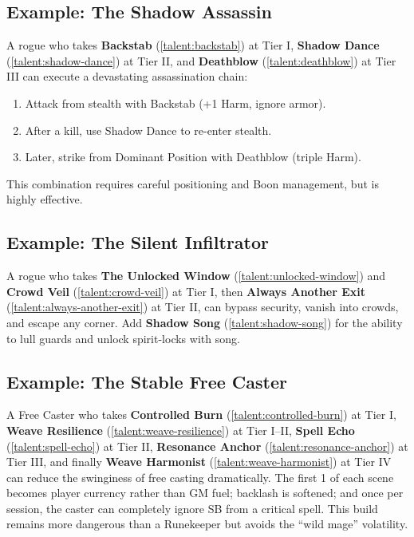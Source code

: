 \subsection*{Example: The Shadow Assassin}
\label{sec:shadow-assassin-example}
A rogue who takes \textbf{Backstab} (\ref{talent:backstab}) at Tier I, \textbf{Shadow Dance} (\ref{talent:shadow-dance}) at Tier II, and \textbf{Deathblow} (\ref{talent:deathblow}) at Tier III can execute a devastating assassination chain:
\begin{enumerate}
\item Attack from stealth with Backstab (+1 Harm, ignore armor).
\item After a kill, use Shadow Dance to re-enter stealth.
\item Later, strike from Dominant Position with Deathblow (triple Harm).
\end{enumerate}
This combination requires careful positioning and Boon management, but is highly effective.

\subsection*{Example: The Silent Infiltrator}
\label{sec:silent-infiltrator-example}
A rogue who takes \textbf{The Unlocked Window} (\ref{talent:unlocked-window}) and \textbf{Crowd Veil} (\ref{talent:crowd-veil}) at Tier I, then \textbf{Always Another Exit} (\ref{talent:always-another-exit}) at Tier II, can bypass security, vanish into crowds, and escape any corner. Add \textbf{Shadow Song} (\ref{talent:shadow-song}) for the ability to lull guards and unlock spirit-locks with song.

\subsection*{Example: The Stable Free Caster}
\label{sec:stable-freecaster-example}
A Free Caster who takes \textbf{Controlled Burn} (\ref{talent:controlled-burn}) at Tier I, \textbf{Weave Resilience} (\ref{talent:weave-resilience}) at Tier I--II, \textbf{Spell Echo} (\ref{talent:spell-echo}) at Tier II, \textbf{Resonance Anchor} (\ref{talent:resonance-anchor}) at Tier III, and finally \textbf{Weave Harmonist} (\ref{talent:weave-harmonist}) at Tier IV can reduce the swinginess of free casting dramatically. The first 1 of each scene becomes player currency rather than GM fuel; backlash is softened; and once per session, the caster can completely ignore SB from a critical spell. This build remains more dangerous than a Runekeeper but avoids the ``wild mage'' volatility.

